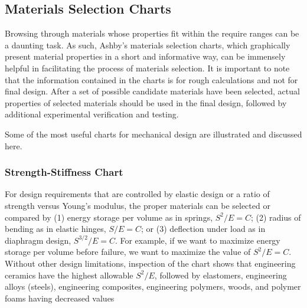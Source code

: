 \documentclass[
10pt,
a4paper,
openany,
svgnames,
]{book}
\begin{document}
\subsection{Materials Selection Charts}

Browsing through materials whose properties fit within the require ranges can be a daunting task. As such, Ashby’s materials selection charts, which graphically present material properties in a short and informative way, can be immensely helpful in facilitating the process of materials selection. It is important to note that the information contained in the charts is for rough calculations and not for final design. After a set of possible candidate materials have been selected, actual properties of selected materials should be used in the final design, followed by additional experimental verification and testing.

Some of the most useful charts for mechanical design are illustrated and discussed here.

\subsubsection{Strength-Stiffness Chart}

For design requirements that are controlled by elastic design or a ratio of strength versus Young’s modulus, the proper materials can be selected or compared by (1) energy storage per volume as in springs, $S^2/E = C$; (2) radius of bending as in elastic hinges, $S/E = C$; or (3) deflection under load as in diaphragm design, $S^{3/2}/E = C$. For example, if we want to maximize energy storage per volume before failure, we want to maximize the value of $S^2/E = C$. Without other design limitations, inspection of the chart shows that engineering ceramics have the highest allowable $S^2/E$, followed by elastomers, engineering alloys (steels), engineering composites, engineering polymers, woods, and polymer foams having decreased values
\end{document}
